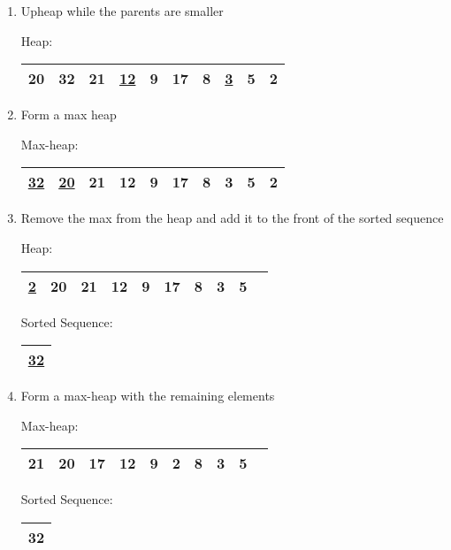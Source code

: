 \documentclass[fleqn, 12pt]{article}
\begin{document}
\begin{enumerate}[Step 1:]
\item Upheap while the parents are smaller
    \begin{center}
        Heap:
        \begin{tabular}{|*{10}{c|}}
            \hline
            20 & 32 & 21 & \underline{12} & 9 & 17 & 8 & \underline{3} & 5 & 2\\
            \hline
        \end{tabular}
    \end{center}
    
\item Form a max heap
    \begin{center}
        Max-heap:
        \begin{tabular}{|*{10}{c|}}
            \hline
            \underline{32} & \underline{20} & 21 & 12 & 9 & 17 & 8 & 3 & 5 & 2\\
            \hline
        \end{tabular}
    \end{center}
    \newpage
    
\item Remove the max from the heap and add it to the front of the sorted sequence
    \begin{center}
        Heap:
        \begin{tabular}{|*{10}{c|}}
            \hline
            \underline{2} & 20 & 21 & 12 & 9 & 17 & 8 & 3 & 5\\
            \hline
        \end{tabular}
    \end{center}
    \begin{center}
        Sorted Sequence:
        \begin{tabular}{|*{1}{c|}}
            \hline
            \underline{32}\\
            \hline
        \end{tabular}
    \end{center}
    
\item Form a max-heap with the remaining elements
    \begin{center}
        Max-heap:
        \begin{tabular}{|*{10}{c|}}
            \hline
            21 & 20 & 17 & 12 & 9 & 2 & 8 & 3 & 5\\
            \hline
        \end{tabular}
    \end{center}
    \begin{center}
        Sorted Sequence:
        \begin{tabular}{|*{1}{c|}}
            \hline
            32\\
            \hline
        \end{tabular}
    \end{center}
    \newpage
    

\end{enumerate}
\end{document}
